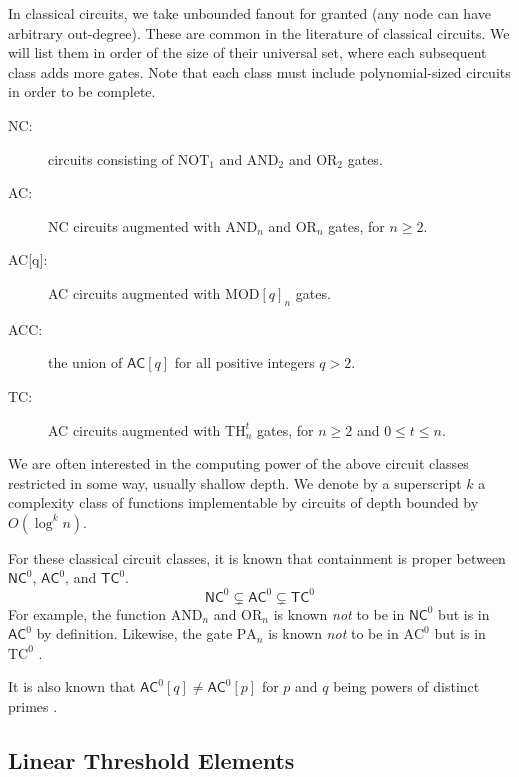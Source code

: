 In classical circuits, we take unbounded fanout
for granted (any node can have arbitrary out-degree). These are common
in the literature of classical circuits. We will list them in order
of the size of their universal set, where each subsequent class adds
more gates. Note that each class must include polynomial-sized circuits
in order to be complete.
%
\begin{description}
\item[\textsf{NC}:]
circuits consisting of $\text{NOT}_1$ and $\text{AND}_2$ and
$\text{OR}_2$ gates.
\item[\textsf{AC}:]
\textsf{NC} circuits augmented with $\text{AND}_n$ and $\text{OR}_n$ gates,
for $n \ge 2$.
\item[\textsf{AC[q]}:] \textsf{AC} circuits augmented with $\text{MOD}[q]_n$ gates.
\item[\textsf{ACC}:] the union of $\textsf{AC}[q]$ for all positive integers $q > 2$.
\item[\textsf{TC}:]
\textsf{AC} circuits augmented with $\text{TH}_n^t$ gates, for $n \ge 2$ and
$0 \le t \le n$.
\end{description}
%
We are often interested in the computing power of the above
circuit classes restricted in some way, usually shallow depth.
We denote by a superscript $k$ a complexity class of
functions implementable by circuits of depth bounded by $O(\log^k n)$.

For these classical circuit classes, it is known that containment
is proper between $\textsf{NC}^0$, $\textsf{AC}^0$, and $\textsf{TC}^0$.
%
\begin{equation}
\textsf{NC}^0 \subsetneq \textsf{AC}^0 \subsetneq \textsf{TC}^0
\end{equation}
%
For example, the function $\text{AND}_n$ and $\text{OR}_n$ is known
\emph{not} to be in $\textsf{NC}^0$ but is in $\textsf{AC}^0$ by
definition. Likewise, the gate $\text{PA}_n$ is
known \emph{not} to be in $\text{AC}^0$ but is in 
$\text{TC}^0$ \cite{Bruck1990}.

It is also known that $\textsf{AC}^0[q] \ne \textsf{AC}^0[p]$
for $p$ and $q$ being powers of distinct primes \cite{Smolensky1987}.

\subsection{Linear Threshold Elements}

